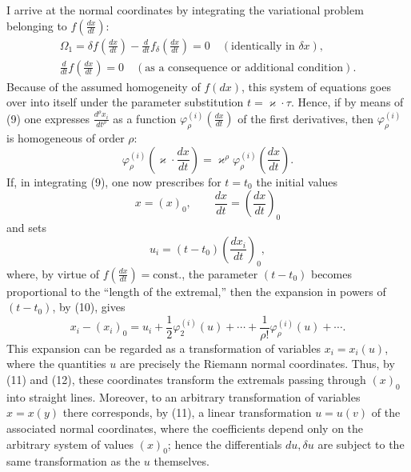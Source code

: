 \documentclass[11pt]{article}
\begin{document}
I arrive at the normal coordinates by integrating the variational problem
belonging to \(f\!\left(\frac{dx}{dt}\right)\):
\begin{equation}
\begin{gathered}
\Omega_1=\delta f\!\left(\frac{dx}{dt}\right)
-\frac{d}{dt}f_\delta\!\left(\frac{dx}{dt}\right)=0
\quad(\text{identically in }\delta x),\\
\frac{d}{dt}f\!\left(\frac{dx}{dt}\right)=0
\quad(\text{as a consequence or additional condition}).
\end{gathered}
\tag{9}
\end{equation}
Because of the assumed homogeneity of \(f(dx)\), this system of equations
goes over into itself under the parameter substitution
\(t=\varkappa\cdot\tau\). Hence, if by means of (9) one expresses
\(\frac{d^\rho x_i}{dt^\rho}\) as a function
\(\varphi_\rho^{(i)}\!\left(\frac{dx}{dt}\right)\) of the first
derivatives, then \(\varphi_\rho^{(i)}\) is homogeneous of order \(\rho\):
\begin{equation}
\varphi_\rho^{(i)}\!\left(\varkappa\cdot\frac{dx}{dt}\right)
=\varkappa^\rho\varphi_\rho^{(i)}\!\left(\frac{dx}{dt}\right).
\tag{10}
\end{equation}
If, in integrating (9), one now prescribes for \(t=t_0\) the initial
values
\[
x=(x)_0,\qquad \frac{dx}{dt}=\left(\frac{dx}{dt}\right)_0
\]
and sets
\begin{equation}
u_i=(t-t_0)\left(\frac{dx_i}{dt}\right)_0,
\tag{11}
\end{equation}
where, by virtue of
\(f\!\left(\frac{dx}{dt}\right)=\mathrm{const.}\), the parameter
\((t-t_0)\) becomes proportional to the ``length of the extremal,'' then
the expansion in powers of \((t-t_0)\), by (10), gives
\begin{equation}
x_i-(x_i)_0=u_i+\frac12\varphi_2^{(i)}(u)+\cdots+
\frac{1}{\rho!}\varphi_\rho^{(i)}(u)+\cdots .
\tag{12}
\end{equation}
This expansion can be regarded as a transformation of variables
\(x_i=x_i(u)\), where the quantities \(u\) are precisely the Riemann
normal coordinates. Thus, by (11) and (12), these coordinates transform
the extremals passing through \((x)_0\) into straight lines. Moreover,
to an arbitrary transformation of variables \(x=x(y)\) there corresponds,
by (11), a linear transformation \(u=u(v)\) of the associated normal
coordinates, where the coefficients depend only on the arbitrary system
of values \((x)_0\); hence the differentials \(du,\delta u\) are subject
to the same transformation as the \(u\) themselves.
\end{document}
